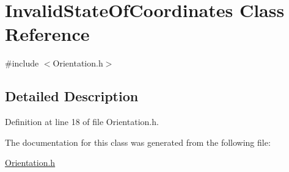 \hypertarget{classInvalidStateOfCoordinates}{\section{Invalid\-State\-Of\-Coordinates Class Reference}
\label{classInvalidStateOfCoordinates}
}


{\ttfamily \#include $<$Orientation.\-h$>$}



\subsection{Detailed Description}


Definition at line 18 of file Orientation.\-h.



The documentation for this class was generated from the following file\-:\begin{DoxyCompactItemize}
\item 
\hyperlink{Orientation_8h}{Orientation.\-h}\end{DoxyCompactItemize}
